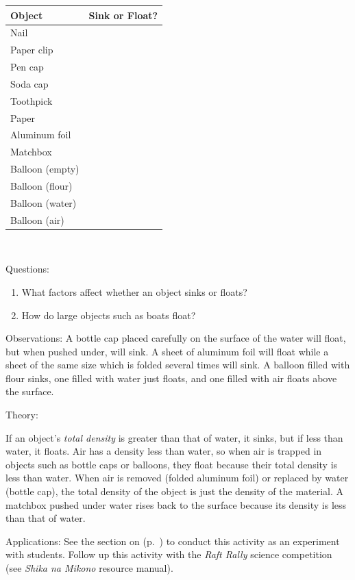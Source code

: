 \begin{multicols}{2}
\begin{tabular}{|l|c|} \hline
\textbf{Object} & \textbf{Sink or Float?} \\ \hline
Nail&  \\ \hline
Paper clip&  \\ \hline
Pen cap&  \\ \hline
Soda cap &  \\ \hline
Toothpick &  \\ \hline
Paper&  \\ \hline
Aluminum foil&  \\ \hline
Matchbox&  \\ \hline
Balloon (empty)&  \\ \hline
Balloon (flour)&  \\ \hline
Balloon (water)&  \\ \hline
Balloon (air)&  \\ \hline
\end{tabular} \\[10pt]
\begin{description*}
\item[Questions:]{}\hfill
\begin{enumerate}
\item What factors affect whether an object sinks or floats?
\item How do large objects such as boats float?
\end{enumerate}
\item[Observations:]{A bottle cap placed carefully on the surface of the water will float, but when pushed under, will sink. A sheet of aluminum foil will float while a sheet of the same size which is folded several times will sink. A balloon filled with flour sinks, one filled with water just floats, and one filled with air floats above the surface.}
\item[Theory:]{If an object's \emph{total density} is greater than that of water, it sinks, but if less than water, it floats. Air has a density less than water, so when air is trapped in objects such as bottle caps or balloons, they float because their total density is less than water. When air is removed (folded aluminum foil) or replaced by water (bottle cap), the total density of the object is just the density of the material. A matchbox pushed under water rises back to the surface because its density is less than that of water.

}
\item[Applications:]{See the section on  (p.~\pageref{sec:scientific-method}) to conduct this activity as an experiment with students. Follow up this activity with the \emph{Raft Rally} science competition (see \emph{Shika na Mikono} resource manual).}
\end{description*}


\end{multicols}

